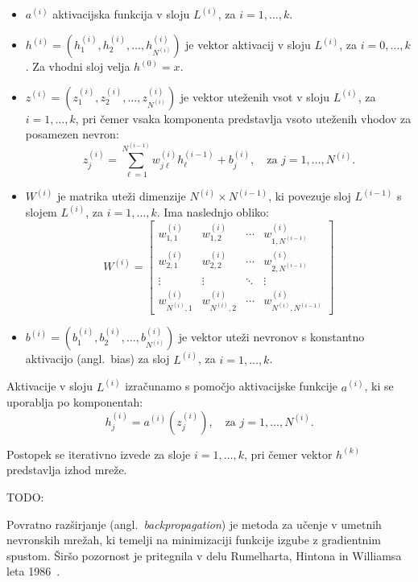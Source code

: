\begin{itemize}
  \item $a^{(i)}$ aktivacijska funkcija v sloju $L^{(i)}$, za $i = 1, \dots, k$.
  
  \item $h^{(i)} = \left(h^{(i)}_1, h^{(i)}_2, \dots, h^{(i)}_{N^{(i)}}\right)$ je vektor aktivacij v sloju $L^{(i)}$, za $i = 0, \dots, k$. Za vhodni sloj velja $h^{(0)} = x$.
  
  \item $z^{(i)} = \left(z^{(i)}_1, z^{(i)}_2, \dots, z^{(i)}_{N^{(i)}}\right)$ je vektor uteženih vsot v sloju $L^{(i)}$, za $i = 1, \dots, k$, pri čemer vsaka komponenta predstavlja vsoto uteženih vhodov za posamezen nevron:
  \[
    z^{(i)}_j = \sum_{\ell=1}^{N^{(i-1)}} w^{(i)}_{j\ell} h^{(i-1)}_\ell + b^{(i)}_j, \quad \text{za } j = 1, \dots, N^{(i)}.
  \]

  \item $W^{(i)}$ je matrika uteži dimenzije $N^{(i)} \times N^{(i-1)}$, ki povezuje sloj $L^{(i-1)}$ s slojem $L^{(i)}$, za $i = 1, \dots, k$. Ima naslednjo obliko:
  \[
    W^{(i)} = \begin{bmatrix}
      w^{(i)}_{1,1} & w^{(i)}_{1,2} & \cdots & w^{(i)}_{1,N^{(i-1)}} \\
      w^{(i)}_{2,1} & w^{(i)}_{2,2} & \cdots & w^{(i)}_{2,N^{(i-1)}} \\
      \vdots       & \vdots       & \ddots & \vdots               \\
      w^{(i)}_{N^{(i)},1} & w^{(i)}_{N^{(i)},2} & \cdots & w^{(i)}_{N^{(i)},N^{(i-1)}}
    \end{bmatrix}
  \]

  \item $b^{(i)} = \left(b^{(i)}_1, b^{(i)}_2, \dots, b^{(i)}_{N^{(i)}}\right)$ je vektor uteži nevronov s konstantno aktivacijo (angl.\ bias) za sloj $L^{(i)}$, za $i = 1, \dots, k$.
\end{itemize}

Aktivacije v sloju $L^{(i)}$ izračunamo s pomočjo aktivacijske funkcije $a^{(i)}$, ki se uporablja po komponentah:
  \[
    h^{(i)}_j = a^{(i)}\left(z^{(i)}_j\right), \quad \text{za } j = 1, \dots, N^{(i)}.
  \]

Postopek se iterativno izvede za sloje $i = 1, \dots, k$, pri čemer vektor $h^{(k)}$ predstavlja izhod mreže.

TODO:

Povratno razširjanje (angl.~\textit{backpropagation}) je metoda za učenje v umetnih nevronskih mrežah, ki temelji na minimizaciji funkcije izgube z gradientnim spustom. Širšo pozornost je pritegnila v delu Rumelharta, Hintona in Williamsa leta 1986~\cite{rumelhart1986learning}.


